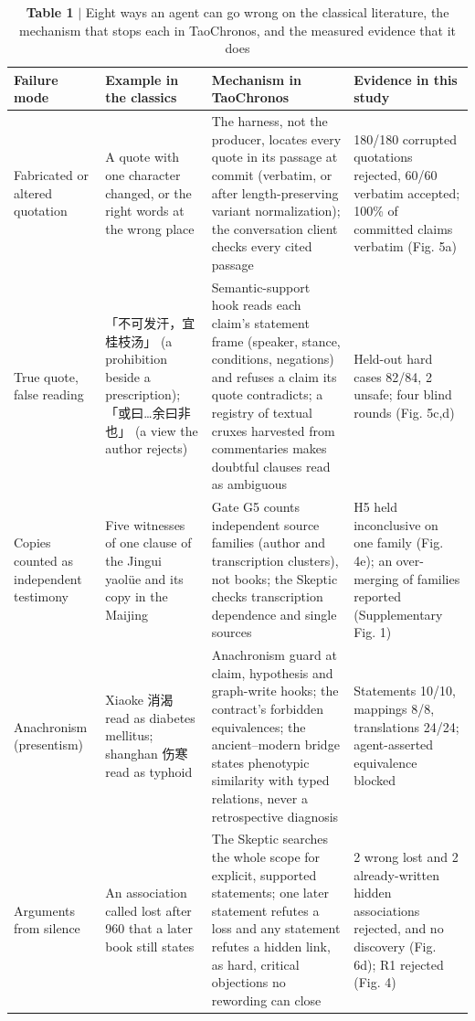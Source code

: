 \begin{table}[t]
\small
\caption{\textbf{Table 1} $|$ Eight ways an agent can go wrong on the classical literature, the mechanism that stops each in TaoChronos, and the measured evidence that it does}
\begin{tabular}{llll}
\toprule
Failure mode & Example in the classics & Mechanism in TaoChronos & Evidence in this study \\
\midrule
Fabricated or altered quotation & A quote with one character changed, or the right words at the wrong place & The harness, not the producer, locates every quote in its passage at commit (verbatim, or after length-preserving variant normalization); the conversation client checks every cited passage & 180/180 corrupted quotations rejected, 60/60 verbatim accepted; 100\% of committed claims verbatim (Fig. 5a) \\
True quote, false reading & 「不可发汗，宜桂枝汤」 (a prohibition beside a prescription); 「或曰…余曰非也」 (a view the author rejects) & Semantic-support hook reads each claim's statement frame (speaker, stance, conditions, negations) and refuses a claim its quote contradicts; a registry of textual cruxes harvested from commentaries makes doubtful clauses read as ambiguous & Held-out hard cases 82/84, 2 unsafe; four blind rounds (Fig. 5c,d) \\
Copies counted as independent testimony & Five witnesses of one clause of the Jingui yaolüe and its copy in the Maijing & Gate G5 counts independent source families (author and transcription clusters), not books; the Skeptic checks transcription dependence and single sources & H5 held inconclusive on one family (Fig. 4e); an over-merging of families reported (Supplementary Fig. 1) \\
Anachronism (presentism) & Xiaoke 消渴 read as diabetes mellitus; shanghan 伤寒 read as typhoid & Anachronism guard at claim, hypothesis and graph-write hooks; the contract's forbidden equivalences; the ancient–modern bridge states phenotypic similarity with typed relations, never a retrospective diagnosis & Statements 10/10, mappings 8/8, translations 24/24; agent-asserted equivalence blocked \\
Arguments from silence & An association called lost after 960 that a later book still states & The Skeptic searches the whole scope for explicit, supported statements; one later statement refutes a loss and any statement refutes a hidden link, as hard, critical objections no rewording can close & 2 wrong lost and 2 already-written hidden associations rejected, and no discovery (Fig. 6d); R1 rejected (Fig. 4) \\

\end{tabular}
\end{table}
